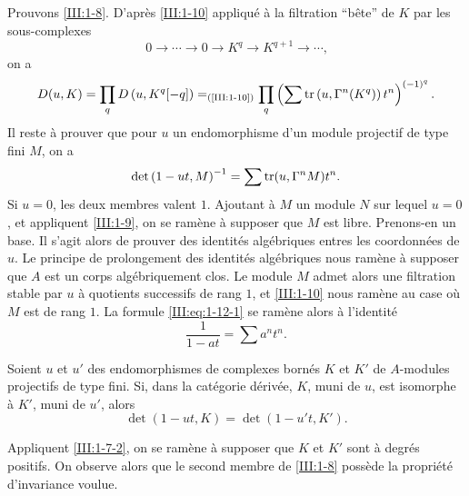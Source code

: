 \subsection{}\label{III:1-12}

Prouvons \ref{III:1-8}. D'après \ref{III:1-10} appliqué à la filtration 
``bête'' de $K$ par les sous-complexes 
\[
  0 \to \cdots \to 0 \to K^q \to K^{q+1} \to \cdots \text{,}
\]
on a 
\[
  D(u,K) = \prod_q D\left(u,K^q[-q]\right) =_{\text{(\ref{III:1-10})}} \prod_q \left(\sum \operatorname{tr}\left(u,\Gamma^n(K^q)\right) t^n \right)^{(-1)^q} \text{.}
\]
Il reste à prouver que pour $u$ un endomorphisme d'un module projectif de type 
fini $M$, on a 
\begin{equation}\label{III:eq:1-12-1}
  \det\left(1-u t,M\right)^{-1} = \sum \operatorname{tr}(u,\Gamma^n M) t^n \text{.}
\end{equation}
Si $u=0$, les deux membres valent $1$. Ajoutant à $M$ un module $N$ sur lequel 
$u=0$, et appliquent \ref{III:1-9}, on se ramène à supposer que $M$ est libre. 
Prenons-en un base. Il s'agit alors de prouver des identités algébriques 
entres les coordonnées de $u$. Le principe de prolongement des identités 
algébriques nous ramène à supposer que $A$ est un corps algébriquement 
clos. Le module $M$ admet alors une filtration stable par $u$ à quotients 
successifs de rang $1$, et \ref{III:1-10} nous ramène au case où $M$ est de 
rang $1$. La formule \eqref{III:eq:1-12-1} se ramène alors à l'identité 
\[
  \frac{1}{1-a t} = \sum a^n t^n \text{.}
\]





\begin{corollary_}\label{III:1-13}
Soient $u$ et $u'$ des endomorphismes de complexes bornés $K$ et $K'$ de 
$A$-modules projectifs de type fini. Si, dans la catégorie dérivée, $K$, 
muni de $u$, est isomorphe à $K'$, muni de $u'$, alors 
\[
  \det(1-u t,K) = \det(1-u' t,K') \text{.}
\]
\end{corollary_}

Appliquent \ref{III:1-7-2}, on se ramène à supposer que $K$ et $K'$ sont à 
degrés positifs. On observe alors que le second membre de \ref{III:1-8} 
possède la propriété d'invariance voulue. 





\subsection{}\label{III:1-14}

